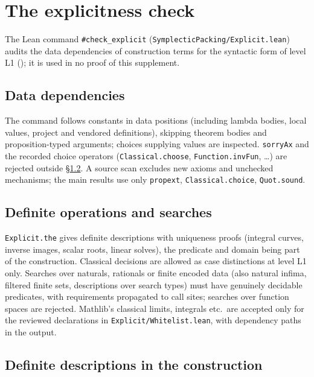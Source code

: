 \section{The explicitness check}\label{sec:xpl}

The Lean command \texttt{\#check\_explicit} (\texttt{SymplecticPacking/Explicit.lean}) audits the data dependencies of construction terms for the syntactic form of level L1 (); it is used in no proof of this supplement.

\subsection{Data dependencies}\label{sec:xpl-traversal}

The command follows constants in data positions (including lambda bodies, local values, project and vendored definitions), skipping theorem bodies and proposition-typed arguments; choices supplying values are inspected. \texttt{sorryAx} and the recorded choice operators (\texttt{Classical.choose}, \texttt{Function.invFun}, \dots) are rejected outside \S\ref{sec:xpl-accept}. A source scan excludes new axioms and unchecked mechanisms; the main results use only \texttt{propext}, \texttt{Classical.choice}, \texttt{Quot.sound}.

\subsection{Definite operations and searches}\label{sec:xpl-accept}

\texttt{Explicit.the} gives definite descriptions with uniqueness proofs (integral curves, inverse images, scalar roots, linear solves), the predicate and domain being part of the construction. Classical decisions are allowed as case distinctions at level L1 only. Searches over naturals, rationals or finite encoded data (also natural infima, filtered finite sets, descriptions over search types) must have genuinely decidable predicates, with requirements propagated to call sites; searches over function spaces are rejected. Mathlib's classical limits, integrals etc.\ are accepted only for the reviewed declarations in \texttt{Explicit/}\allowbreak\texttt{Whitelist.lean}, with dependency paths in the output.

\begingroup\sloppy

\subsection{Definite descriptions in the construction}\label{sec:xpl-descriptions}


